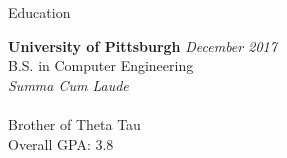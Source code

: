 \documentclass{resume} %
\begin{document}

\begin{rSection}{Education}

{\bf University of Pittsburgh} \hfill {\em December 2017} \\ 
B.S. in Computer Engineering \\
\textit{Summa Cum Laude} \\
\smallskip \\
Brother of Theta Tau \\
Overall GPA: 3.8

\end{rSection}

\end{document}
